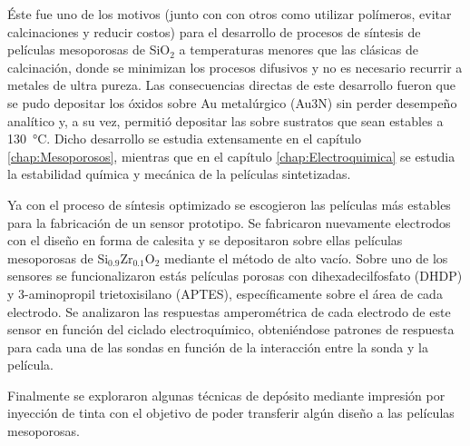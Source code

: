 	Éste fue uno de los motivos (junto con con otros como utilizar polímeros, evitar calcinaciones y reducir costos) para el desarrollo de procesos de síntesis de películas mesoporosas de SiO$_2$ a temperaturas menores que las clásicas de calcinación, donde se minimizan los procesos difusivos y no es necesario recurrir a metales de ultra pureza. Las consecuencias directas de este desarrollo fueron que se pudo depositar los óxidos sobre Au metalúrgico (Au3N) sin perder desempeño analítico y, a su vez, permitió depositar las \pdm\space sobre sustratos que sean estables a \SI{130}{\celsius}. Dicho desarrollo se estudia extensamente en el capítulo \ref{chap:Mesoporosos}, mientras que en el capítulo \ref{chap:Electroquimica} se estudia la estabilidad química y mecánica de la películas sintetizadas.

	Ya con el proceso de síntesis optimizado se escogieron las películas más estables para la fabricación de un sensor prototipo. Se fabricaron nuevamente electrodos con el diseño en forma de calesita y se depositaron sobre ellas películas mesoporosas de Si$_{0.9}$Zr$_{0.1}$O$_2$ mediante el método de alto vacío. Sobre uno de los sensores se funcionalizaron estás películas porosas con dihexadecilfosfato (DHDP) y 3-aminopropil trietoxisilano (APTES), específicamente sobre el área de cada electrodo.
	Se analizaron las respuestas amperométrica de cada electrodo de este sensor en función del ciclado electroquímico, obteniéndose patrones de respuesta para cada una de las sondas en función de la interacción entre la sonda y la película. 
	
	Finalmente se exploraron algunas técnicas de depósito mediante impresión por inyección de tinta con el objetivo de poder transferir algún diseño a las películas mesoporosas.


























